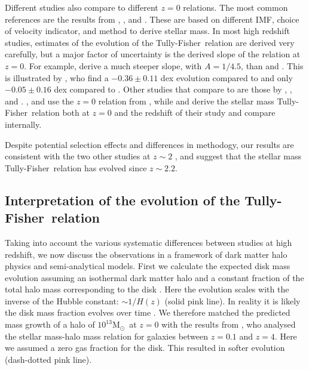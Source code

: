 \documentclass{emulateapj}
\newcommand{\msun}{$\mathrm{M_{\odot}}$}
\newcommand{\tf}{Tully-Fisher}
\begin{document}
{Different studies also compare to different $z=0$ relations. The most common references are the results from \citet{Bell01}, \citet{Pizagno05}, and \citet{Reyes11}. These are based on different IMF, choice of velocity indicator, and method to derive stellar mass. In most high redshift studies, estimates of the evolution of the \tf\ relation are derived very carefully, but a major factor of uncertainty is the derived slope of the relation at $z=0$. For example, \citet{Bell01} derive a much steeper slope, with $A=1/4.5$, than \citet{Pizagno05} and \citet{Reyes11}. This is illustrated by \citet{Vergani12}, who find a $-0.36\pm0.11$ dex evolution compared to \citet{Pizagno07} and only $-0.05\pm 0.16$ dex compared to \citet{Bell01}. Other studies that compare to \citet{Bell01} are those by \citet{Conselice05}, \citet[][based on the results of \citet{Kassin07}]{Dutton11}, \citet{Cresci09} and \citet{Gnerucci11}. \citet{Miller11}, \citet{Miller12} and \citet{Simons16} use the $z=0$ relation from \citet{Reyes11}, while \citet{Puech08} {and \citet{Tiley16}} derive the stellar mass \tf\ relation both at $z=0$ and {the redshift of their study} and compare internally.

{Despite potential selection effects and differences in methodogy, our results are consistent with the two other studies at $z\sim2$ \citep{Cresci09,Simons16}, and suggest that the stellar mass \tf\ relation has evolved since $z\sim2.2$.}



\subsection{Interpretation of the evolution of the \tf\ relation}

Taking into account the various systematic differences between studies at high redshift, {w}e now discuss the observations in a framework of {dark matter halo physics and }semi-analytical models. {First we calculate the expected disk mass evolution assuming an isothermal dark matter halo and a constant fraction of the total halo mass corresponding to the disk \citep[see also Equation 4 of][]{Mo98}. Here the evolution scales with the inverse of the Hubble constant: $\sim 1/H(z)$ (solid pink line). In reality it is likely the disk mass fraction evolves over time \citep[e.g.,][]{Papovich14}. We therefore matched the predicted mass growth of a halo of $10^{13}$\msun\ at $z=0$ with the results from \citet{Behroozi10}, who analysed the stellar mass-halo mass relation for galaxies between $z=0.1$ and $z=4$. Here we assumed a zero gas fraction for the disk. This resulted in softer evolution (dash-dotted pink line).}

}
\end{document}
